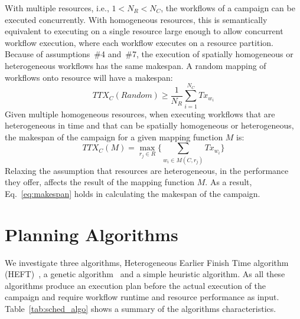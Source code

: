 With multiple resources, i.e., $1 < N_{R} < N_{C}$, the workflows of a
campaign can be executed concurrently. With homogeneous resources, this is
semantically equivalent to executing on a single resource large enough to
allow concurrent workflow execution, where each workflow executes on a
resource partition. Because of assumptions~\#4 and~\#7, the execution of
spatially homogeneous or heterogeneous workflows has the same makespan. A
random mapping of workflows onto resource will have a makespan:
\begin{equation}
   TTX_{C}(Random) \geq \frac{1}{N_{R}}\sum_{i=1}^{N_{C}} Tx_{w_{i}}
\end{equation}
Given multiple homogeneous resources, when executing workflows that are
heterogeneous in time and that can be spatially homogeneous or heterogeneous,
the makespan of the campaign for a given mapping function $ M $ is:
\begin{equation}
TTX_{C}(M) = \max_{r_{j}\in R}\Big\{\sum_{w_{i}\in M(C,r_{j})}Tx_{w_{i}}\Big\}
\label{eq:makespan}
\end{equation}
Relaxing the assumption that resources are heterogeneous, in the performance
they offer, affects the result of the mapping function $ M $. As a result,
Eq.~\ref{eq:makespan} holds in calculating the makespan of the campaign.


\section{Planning Algorithms}
\label{sec:algo}

We investigate three algorithms, Heterogeneous Earlier Finish Time algorithm
(HEFT)~\cite{topcuoglu2002performance}, a genetic
algorithm~\cite{page2005algorithm} and a simple heuristic algorithm. As all
these algorithms produce an execution plan before the actual execution of the
campaign and require workflow runtime and resource performance as input.
Table~\ref{tab:sched_algo} shows a summary of the algorithms characteristics.

